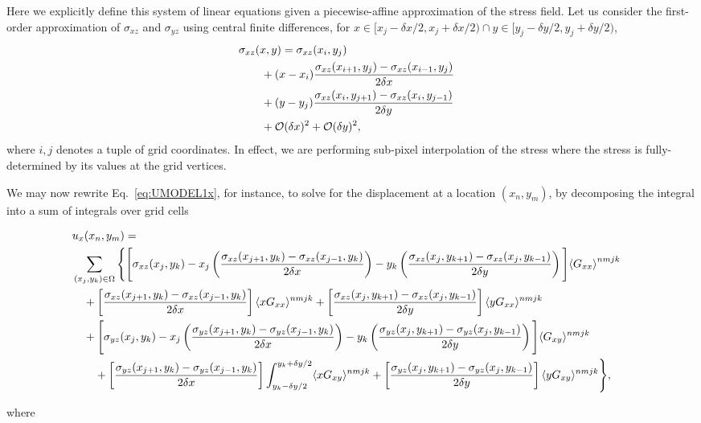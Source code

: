 \documentclass[aps,prl,reprint,twocolumn,groupedaddress,showpacs]{revtex4-1}
\begin{document}
Here we explicitly define this system of linear equations given a
piecewise-affine approximation of the stress field. Let us consider
the first-order approximation of $\sigma_{xz}$ and $\sigma_{yz}$ using
central finite differences, for $x\in[x_j - \delta x/2, x_j+\delta
  x/2) \cap y\in[y_j-\delta y/2, y_j + \delta y /2)$,
\begin{align}
\lefteqn{\sigma_{xz}(x,y) =\sigma_{xz}(x_i , y_j)  }\nonumber \\
& \qquad+ (x-x_i)\frac{\sigma_{xz}(x_{i+1},y_j) -\sigma_{xz}(x_{i-1},y_j) }{2\delta x}  \nonumber\\
&\qquad + (y-y_j)\frac{\sigma_{xz}(x_i,y_{j+1}) - \sigma_{xz}(x_i,y_{j-1}) }{2\delta y} \nonumber\\
&\qquad + \mathcal{O}(\delta x)^2 + \mathcal{O}(\delta y)^2,\label{eq:sigma_affine}
\end{align}
where $i,j$ denotes a tuple of grid coordinates. In effect, we are
performing sub-pixel interpolation of the stress where the stress is
fully-determined by its values at the grid vertices.

We may now rewrite Eq.~\ref{eq:UMODEL1x}, for instance, to solve for
the displacement at a location $(x_n,y_m)$, by decomposing the
integral into a sum of integrals over grid cells
%
\begin{widetext}
\begin{align}
 \lefteqn{u_x(x_n,y_m) =} \nonumber\\
 & \sum_{(x_j,y_k)\in\Omega} \Bigg\{ \Bigg[\sigma_{xz}(x_j,y_k)  - x_j\left(\frac{\sigma_{xz}(x_{j+1},y_k) - \sigma_{xz}(x_{j-1},y_k) }{2\delta x }    \right)    -y_k\left( \frac{\sigma_{xz}(x_j,y_{k+1}) -  \sigma_{xz}(x_j,y_{k-1}) }{2\delta y}\right) \Bigg]{ \langle G_{xx} \rangle}^{nmjk} \nonumber \\
&\quad+\left[ \frac{\sigma_{xz}(x_{j+1},y_k) -  \sigma_{xz}(x_{j-1},y_k) }{2\delta x}   \right]\langle xG_{xx} \rangle^{nmjk} + \left[  \frac{\sigma_{xz}(x_j,y_{k+1}) - \sigma_{xz}(x_j,y_{k-1}) }{2\delta y} \right] \langle yG_{xx} \rangle^{nmjk}\nonumber\\
&\quad+  \Bigg[\sigma_{yz}(x_j,y_k) -x_j\left(\frac{\sigma_{yz}(x_{j+1},y_k) - \sigma_{yz}(x_{j-1},y_k) }{2\delta x}    \right)    -y_k\left( \frac{\sigma_{yz}(x_j,y_{k+1}) - \sigma_{yz}(x_j,y_{k-1}) }{2\delta y}\right) \Bigg] \langle G_{xy} \rangle^{nmjk}\nonumber \\
&\qquad +\left[ \frac{\sigma_{yz}(x_{j+1},y_k) -  \sigma_{yz}(x_{j-1},y_k) }{2\delta x}   \right]  \int_{y_k-\delta y/2}^{y_k+\delta y/2}  \langle xG_{xy} \rangle^{nmjk} + \left[  \frac{\sigma_{yz}(x_j,y_{k+1}) - \sigma_{yz}(x_j,y_{k-1}) }{2\delta y} \right] \langle yG_{xy} \rangle^{nmjk} \Bigg\},
\label{eq:ux_decomposed}
\end{align}
\end{widetext}
%
where
\end{document}

